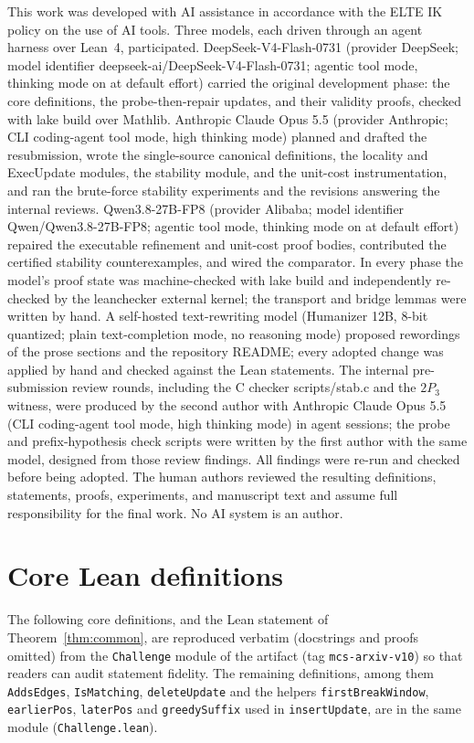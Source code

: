 \documentclass[11pt]{article}
\theoremstyle{definition}
\theoremstyle{remark}
\newcommand{\leanname}[1]{%
  \texttt{\begingroup\def\_{\textunderscore\allowbreak}#1\endgroup}}
\begin{document}
This work was developed with AI assistance in accordance with the ELTE IK policy
on the use of AI tools. Three models, each driven through an agent harness over
Lean~4, participated. DeepSeek-V4-Flash-0731 (provider DeepSeek; model
identifier deepseek-ai/DeepSeek-V4-Flash-0731; agentic tool mode, thinking mode
on at default effort) carried the original development phase: the core
definitions, the probe-then-repair updates, and their validity proofs, checked
with lake build over Mathlib. Anthropic Claude Opus 5.5 (provider Anthropic; CLI
coding-agent tool mode, high thinking mode) planned and drafted the
resubmission, wrote the single-source canonical definitions, the locality and
ExecUpdate modules, the stability module, and the unit-cost instrumentation, and
ran the brute-force stability experiments and the revisions answering the
internal reviews. Qwen3.8-27B-FP8 (provider Alibaba; model identifier
Qwen/Qwen3.8-27B-FP8; agentic tool mode, thinking mode on at default effort)
repaired the executable refinement and unit-cost proof bodies, contributed the
certified stability counterexamples, and wired the comparator. In every phase
the model's proof state was machine-checked with lake build and independently
re-checked by the leanchecker external kernel; the transport and bridge lemmas
were written by hand. A self-hosted text-rewriting model (Humanizer 12B, 8-bit
quantized; plain text-completion mode, no reasoning mode) proposed rewordings of
the prose sections and the repository README; every adopted change was applied
by hand and checked against the Lean statements. The internal pre-submission
review rounds, including the C checker scripts/stab.c and the $2P_3$ witness,
were produced by the second author with Anthropic Claude Opus 5.5 (CLI
coding-agent tool mode, high thinking mode) in agent sessions; the probe and prefix-hypothesis check scripts
were written by the first author with the same model, designed from those
review findings. All findings were re-run and checked before being adopted. The human
authors reviewed the resulting definitions, statements, proofs, experiments, and
manuscript text and assume full responsibility for the final work. No AI system
is an author.

\appendix
\section{Core Lean definitions}
\label{app:lean-defs}

The following core definitions, and the Lean statement of
Theorem~\ref{thm:common}, are reproduced verbatim (docstrings and proofs omitted) from the
\leanname{Challenge} module of the artifact (tag \leanname{mcs-arxiv-v10}) so that
readers can audit statement fidelity. The remaining definitions, among them
\leanname{AddsEdges}, \leanname{IsMatching}, \leanname{deleteUpdate} and the
helpers \leanname{firstBreakWindow}, \leanname{earlierPos}, \leanname{laterPos}
and \leanname{greedySuffix} used in \leanname{insertUpdate}, are in the same
module (\texttt{Challenge.lean}).
\end{document}
